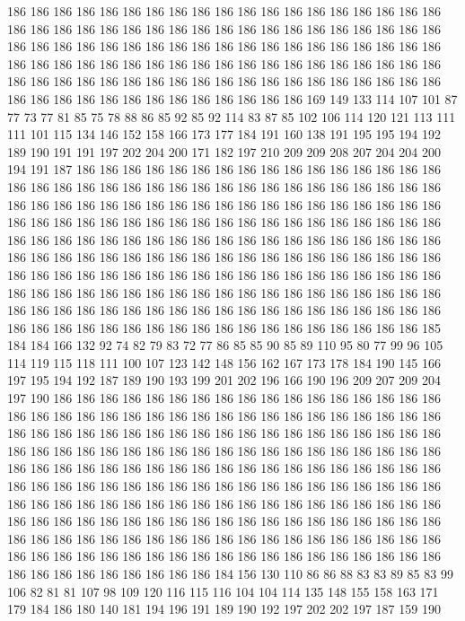 186 186 186 186 186 186 186 186 186 186 186 186 186 186 186 186 186 186 186 186
186 186 186 186 186 186 186 186 186 186 186 186 186 186 186 186 186 186 186 186
186 186 186 186 186 186 186 186 186 186 186 186 186 186 186 186 186 186 186 186
186 186 186 186 186 186 186 186 186 186 186 186 186 186 186 186 186 186 186 186
186 186 186 186 186 186 186 186 186 186 186 186 186 186 186 186 186 186 186 186
186 186 186 186 186 186 186 186 169 149 133 114 107 101 87 77 73 77 81 85
75 78 88 86 85 92 85 92 114 83 87 85 102 106 114 120 121 113 111 111
101 115 134 146 152 158 166 173 177 184 191 160 138 191 195 195 194 192 189 190
191 191 197 202 204 200 171 182 197 210 209 209 208 207 204 204 200 194 191 187
186 186 186 186 186 186 186 186 186 186 186 186 186 186 186 186 186 186 186 186
186 186 186 186 186 186 186 186 186 186 186 186 186 186 186 186 186 186 186 186
186 186 186 186 186 186 186 186 186 186 186 186 186 186 186 186 186 186 186 186
186 186 186 186 186 186 186 186 186 186 186 186 186 186 186 186 186 186 186 186
186 186 186 186 186 186 186 186 186 186 186 186 186 186 186 186 186 186 186 186
186 186 186 186 186 186 186 186 186 186 186 186 186 186 186 186 186 186 186 186
186 186 186 186 186 186 186 186 186 186 186 186 186 186 186 186 186 186 186 186
186 186 186 186 186 186 186 186 186 186 186 186 186 186 186 186 186 186 186 186
186 186 186 186 186 186 186 186 186 186 186 186 186 186 186 186 186 186 186 186
186 186 186 186 186 186 185 184 184 166 132 92 74 82 79 83 72 77 86 85
85 90 85 89 110 95 80 77 99 96 105 114 119 115 118 111 100 107 123 142
148 156 162 167 173 178 184 190 145 166 197 195 194 192 187 189 190 193 199 201
202 196 166 190 196 209 207 209 204 197 190 186 186 186 186 186 186 186 186 186
186 186 186 186 186 186 186 186 186 186 186 186 186 186 186 186 186 186 186 186
186 186 186 186 186 186 186 186 186 186 186 186 186 186 186 186 186 186 186 186
186 186 186 186 186 186 186 186 186 186 186 186 186 186 186 186 186 186 186 186
186 186 186 186 186 186 186 186 186 186 186 186 186 186 186 186 186 186 186 186
186 186 186 186 186 186 186 186 186 186 186 186 186 186 186 186 186 186 186 186
186 186 186 186 186 186 186 186 186 186 186 186 186 186 186 186 186 186 186 186
186 186 186 186 186 186 186 186 186 186 186 186 186 186 186 186 186 186 186 186
186 186 186 186 186 186 186 186 186 186 186 186 186 186 186 186 186 186 186 186
186 186 186 186 186 186 186 186 186 186 186 186 186 186 186 186 186 186 186 186
186 186 186 186 186 186 186 186 184 156 130 110 86 86 88 83 83 89 85 83
99 106 82 81 81 107 98 109 120 116 115 116 104 104 114 135 148 155 158 163
171 179 184 186 180 140 181 194 196 191 189 190 192 197 202 202 197 187 159 190
